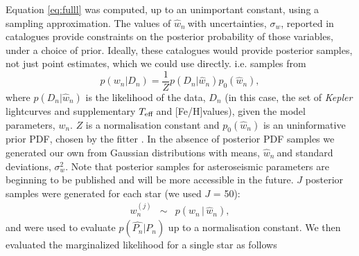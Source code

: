 \documentclass[10pt,preprint]{aastex}
\newcommand{\logg}{log \emph{g}}
\newcommand{\teff}{$T_{\rm{eff}}$}
\newcommand{\wh}{$\hat{w}_n$}
\newcommand{\feh}{[Fe/H]}
\begin{document}
Equation \ref{eq:fulll} was computed, up to an unimportant constant, using a sampling approximation.
The values of \wh$~$with uncertainties, $\sigma_w$, reported in catalogues provide constraints on the posterior probability of those variables, under a choice of prior.
Ideally, these catalogues would provide posterior samples, not just point estimates, which we could use directly.
i.e. samples from
\begin{equation}
p(w_n|D_n) = \frac{1}{Z}p(D_n|\hat{w}_n)p_0(\hat{w}_n),
\end{equation}
where $p(D_n|\hat{w}_n)$ is the likelihood of the data, $D_n$ (in this case, the set of {\it Kepler} lightcurves and supplementary \teff$~$and \feh values), given the model parameters, $w_n$.
$Z$ is a normalisation constant and $p_0(\hat{w}_n)$ is an uninformative prior PDF, chosen by the fitter \citep[][used a flat prior in age and \logg]{Chaplin2014}.
In the absence of posterior PDF samples we generated our own from Gaussian distributions with means, \wh$~$and standard deviations, $\sigma_w^2$.
Note that posterior samples for asteroseismic parameters are beginning to be published and will be more accessible in the future.
$J$ posterior samples were generated for each star (we used $J$ = 50):
\begin{eqnarray}
w_n^{(j)} &\sim& p(w_n\,|\,\hat{w}_n),
\end{eqnarray}
and were used to evaluate $p(\hat{P_n}|P_n)$ up to a normalisation constant.
We then evaluated the marginalized likelihood for a single star as follows
\end{document}

